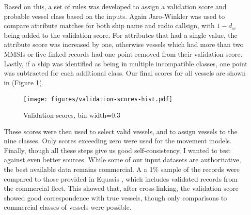 Based on this, a set of rules was developed to assign a validation score and probable vessel class based on the inputs.  Again Jaro-Winkler was used to compare attribute matches for both ship name and radio callsign, with $1 - d_w$ being added to the validation score. For attributes that had a single value, the attribute score was increased by one, otherwise vessels which had more than two MMSIs or five linked records had one point removed from their validation score. Lastly, if a ship was identified as being in multiple incompatible classes, one point was subtracted for each additional class. Our final scores for all vessels are shown in (Figure \ref{fig:validation-score-hist}).

\begin{figure}[h!]
  \centering
    \texttt{[image: figures/validation-scores-hist.pdf]}
  \caption {Validation scores, bin width=0.3}
  \label{fig:validation-score-hist}
\end{figure}

These scores were then used to select valid vessels, and to assign vessels to the nine classes. Only scores exceeding zero were used for the movement models. Finally, though all these steps give us good self-consistency, I wanted to test against even better sources.  %
While some of our input datasets are authoritative, the best available data remains commercial. A a 1\% sample of the records were compared to those provided in Equasis \citep{Equasis2011}, which includes validated records from the commercial fleet. This showed that, after cross-linking, the validation score showed good correspondence with true vessels, though only comparisons to commercial classes of vessels were possible.

